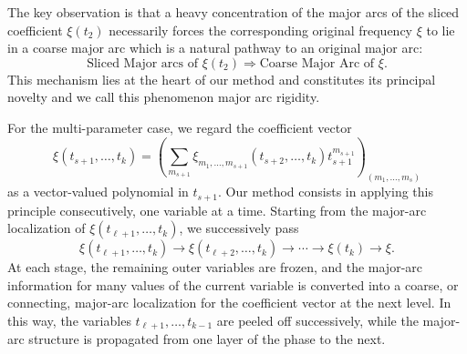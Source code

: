 \documentclass[10pt,a4paper]{amsart}
\numberwithin{equation}{section}
\begin{document}
 
 	
The key observation is that a heavy  concentration of the major arcs of the sliced coefficient $\xi(t_2)$ necessarily forces the corresponding original frequency $\xi$ to lie in a coarse major arc which is a natural pathway to an original major arc:
\[
\text{Sliced Major arcs of $\xi(t_2)$}
\Longrightarrow
\text{Coarse Major Arc of $\xi$.}
\]
This mechanism lies at the heart of our method and constitutes its principal novelty and we call this phenomenon  major arc rigidity.



For the multi-parameter case, we regard the coefficient vector
\[
\xi(t_{s+1},\ldots,t_k)
=
\left(
\sum_{m_{s+1}}
\xi_{m_1,\ldots,m_{s+1}}(t_{s+2},\ldots,t_k)
t_{s+1}^{m_{s+1}}
\right)_{(m_1,\ldots,m_s)}
\]
as a vector-valued polynomial in $t_{s+1}$.
Our method consists in applying this principle consecutively, one variable
at a time. Starting from the major-arc localization of
\(\xi(t_{\ell+1},\ldots,t_k)\), we successively pass
\[
\xi(t_{\ell+1},\ldots,t_k)
\longrightarrow
\xi(t_{\ell+2},\ldots,t_k)
\longrightarrow \cdots \longrightarrow
\xi(t_k)
\longrightarrow
\xi.
\]
At each stage, the remaining outer variables are frozen, and the
major-arc information for many values of the current variable is converted
into a coarse, or connecting, major-arc localization for the coefficient
vector at the next level. In this way, the variables
\(t_{\ell+1},\ldots,t_{k-1}\) are peeled off successively, while the
major-arc structure is propagated from one layer of the phase to the next.



 








 

 
\end{document}
